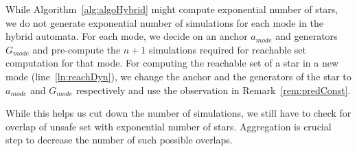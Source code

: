 \begin{remark}
\label{rem:hybridAlgo}
While Algorithm~\ref{alg:algoHybrid} might compute exponential number of stars, we do not generate exponential number of simulations for each mode in the hybrid automata. For each mode, we decide on an anchor $a_{mode}$ and generators $G_{mode}$ and pre-compute the $n+1$ simulations required for reachable set computation for that mode. For computing the reachable set of a star in a new mode (line~\ref{ln:reachDyn}), we change the anchor and the generators of the star to $a_{mode}$ and $G_{mode}$ respectively and use the observation in Remark~\ref{rem:predConst}. 

While this helps us cut down the number of simulations, we still have to check for overlap of unsafe set with exponential number of stars. Aggregation is crucial step to decrease the number of such possible overlaps.
\end{remark}


%
%

